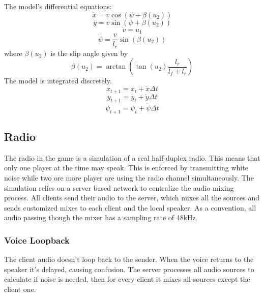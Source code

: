 \documentclass{article}
\begin{document}
\smallskip
The model's differential equations:
\begin{equation}\dot{x} = v \cos(\psi + \beta (u_2)) \end{equation}
\begin{equation}\dot{y} = v \sin(\psi + \beta (u_2)) \end{equation}
\begin{equation}\dot{v} = u_1 \end{equation}
\begin{equation}\dot{\psi} = \frac{v} {l_r} \sin(\beta(u_2)) \end{equation}
\medskip
where \( \beta(u_2) \) is the slip angle given by
\begin{equation} \beta(u_2) = \arctan (\tan(u_2) \frac{l_r} { l_f + l_r })  \end{equation}
\bigskip
The model is integrated discretely.
\begin{equation} x_{t+1} = x_t + \dot{x}\Delta t \end{equation}
\begin{equation} y_{t+1} = y_t + \dot{y}\Delta t \end{equation}
\begin{equation} {\psi}_{t+1} = {\psi}_t + \dot{\psi}\Delta t\end{equation}

\clearpage

\subsection{Radio}
The radio in the game is a simulation of a real half-duplex radio. This means that only one player at the time may speak. This is enforced by transmitting white noise while two ore more player are using the radio channel simultaneously. The simulation relies on a server based network to centralize the audio mixing process. All clients send their audio to the server, which mixes all the sources and sends customized mixes to each client and the local speaker. As a convention, all audio passing though the mixer has a sampling rate of 48kHz. 
\subsubsection{Voice Loopback}
The client audio doesn't loop back to the sender. When the voice returns to the speaker it's delayed, causing confusion. The server processes all audio sources to calculate if noise is needed, then for every client it mixes all sources except the client one.
\end{document}

